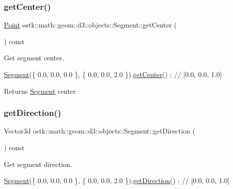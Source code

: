 \subsubsection{\texorpdfstring{get\+Center()}{getCenter()}}
{\footnotesize\ttfamily \hyperlink{classostk_1_1math_1_1geom_1_1d3_1_1objects_1_1_point}{Point} ostk\+::math\+::geom\+::d3\+::objects\+::\+Segment\+::get\+Center (\begin{DoxyParamCaption}{ }\end{DoxyParamCaption}) const}



Get segment center. 


\begin{DoxyCode}
\hyperlink{classostk_1_1math_1_1geom_1_1d3_1_1objects_1_1_segment_aa2cb60ce06335a5f76120c658219494c}{Segment}(\{ 0.0, 0.0, 0.0 \}, \{ 0.0, 0.0, 2.0 \}).\hyperlink{classostk_1_1math_1_1geom_1_1d3_1_1objects_1_1_segment_a7d37a80e12053ec307dfd8e4d3973843}{getCenter}() ; \textcolor{comment}{// [0.0, 0.0, 1.0]}
\end{DoxyCode}


\begin{DoxyReturn}{Returns}
\hyperlink{classostk_1_1math_1_1geom_1_1d3_1_1objects_1_1_segment}{Segment} center 
\end{DoxyReturn}
\mbox{\label{classostk_1_1math_1_1geom_1_1d3_1_1objects_1_1_segment_ab708b9d0ab53ef8b15974244810a732f}} 
\subsubsection{\texorpdfstring{get\+Direction()}{getDirection()}}
{\footnotesize\ttfamily Vector3d ostk\+::math\+::geom\+::d3\+::objects\+::\+Segment\+::get\+Direction (\begin{DoxyParamCaption}{ }\end{DoxyParamCaption}) const}



Get segment direction. 


\begin{DoxyCode}
\hyperlink{classostk_1_1math_1_1geom_1_1d3_1_1objects_1_1_segment_aa2cb60ce06335a5f76120c658219494c}{Segment}(\{ 0.0, 0.0, 0.0 \}, \{ 0.0, 0.0, 2.0 \}).\hyperlink{classostk_1_1math_1_1geom_1_1d3_1_1objects_1_1_segment_ab708b9d0ab53ef8b15974244810a732f}{getDirection}() ; \textcolor{comment}{// [0.0, 0.0, 1.0]}
\end{DoxyCode}


